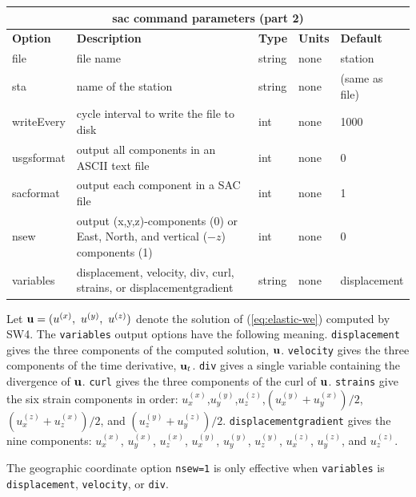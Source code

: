 \documentclass[11pt]{report}
\begin{document}
\begin{center}
\begin{tabular}{|l|p{8cm}|l|l|l|} \hline
\multicolumn{5}{|c|}{\bf sac command parameters (part 2)}\\ \hline
\bf{Option} & \bf{Description} & \bf{Type} & \bf{Units} & \bf{Default} \\ \hline \hline
file & file name  & string & none & station \\ \hline
sta & name of the station & string & none & (same as file) \\ \hline
writeEvery & cycle interval to write the file to disk & int & none & 1000 \\ \hline
%
usgsformat & output all components in an ASCII text file & int & none & 0 \\ \hline
sacformat & output each component in a SAC file & int & none & 1 \\ \hline 
\hline
nsew & output (x,y,z)-components (0) or East, North, and vertical ($-z$) components (1)& int & none & 0 \\ \hline
variables & displacement, velocity, div, curl, strains, or displacementgradient & string & none & displacement \\ \hline
\end{tabular}
\end{center}
Let ${\bf u}=(u^{(x)},\ u^{(y)},\ u^{(z)})$ denote the solution of (\ref{eq:elastic-we}) computed by SW4. 
The {\tt variables} output options have the following meaning. {\tt displacement} gives the three components of the computed solution, ${\bf u}$. {\tt velocity} gives the three components of the time derivative, ${\bf u}_t$. {\tt div} gives a single variable containing the divergence of ${\bf u}$. {\tt curl} gives the three components of the curl of ${\bf u}$. {\tt strains} give the six strain components in order: $u^{(x)}_x$,$u^{(y)}_y$,$u^{(z)}_z$,$(u^{(y)}_x+u^{(x)}_y)/2$, $(u^{(z)}_x+u^{(x)}_z)/2$, and
$(u^{(y)}_z+u^{(z)}_y)/2$. {\tt displacementgradient} gives the nine components: $u^{(x)}_x$, $u^{(x)}_y$, $u^{(x)}_z$,
$u^{(y)}_x$, $u^{(y)}_y$, $u^{(y)}_z$, $u^{(z)}_x$, $u^{(z)}_y$, and $u^{(z)}_z$. \par

The geographic coordinate option {\tt nsew=1} is only effective when {\tt variables} is
{\tt displacement}, {\tt velocity}, or {\tt div}.


\end{document}

